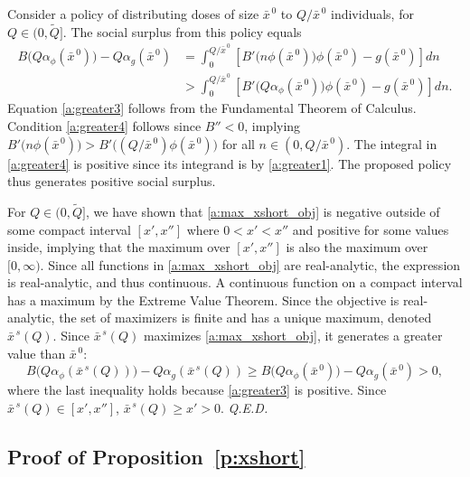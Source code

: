 \documentclass[12pt]{article}
\renewcommand{\qed}{{\it Q.E.D.}}
\newcommand{\efficacy}{\phi}
\newcommand{\general}{g}
\newcommand{\benefit}{B}
\newcommand{\xshortbar}{\bar{x}^{\,s}}
\newcommand{\xnobar}{\bar{x}^{\,0}}
\newcommand{\perunit}[1]{\alpha_{#1}}
\newcommand{\Qtilde}{\tilde{Q}}
\begin{document}
Consider a policy of distributing doses of size $\xnobar$ to $Q /
\xnobar$ individuals, for $Q \in (0, \Qtilde]$. The social surplus
from this policy equals
\begin{align}
\benefit \bigl( Q \perunit{\efficacy}\!(\xnobar) \bigr) - Q \perunit{\general}\!(\xnobar) 
& = \int_0^{Q/\xnobar} \left[ \benefit' \! \bigl( n \efficacy(\xnobar) \bigr) \efficacy(\xnobar) - \general(\xnobar) \right] dn \label{a:greater2} \\
& > \int_0^{Q/\xnobar} \left[ \benefit' \! \bigl( Q \perunit{\efficacy}\!(\xnobar) \bigr) \efficacy(\xnobar) - \general(\xnobar) \right] dn. \label{a:greater3} 
\end{align}
Equation \eqref{a:greater3} follows from the Fundamental Theorem of
Calculus. Condition \eqref{a:greater4} follows since $\benefit'' < 0$,
implying $\benefit' \! \bigl( n \efficacy(\xnobar) \bigr) > \benefit'
\! \bigl( (Q/\xnobar)\efficacy(\xnobar) \bigr)$ for all $n \in (0,
Q/\xnobar)$. The integral in \eqref{a:greater4} is positive since its
integrand is by \eqref{a:greater1}. The proposed policy thus generates
positive social surplus.

For $Q \in (0, \Qtilde]$, we have shown that \eqref{a:max_xshort_obj}
  is negative outside of some compact interval $[x', x'']$ where $0 <
  x' < x''$ and positive for some values inside, implying that the
  maximum over $[x', x'']$ is also the maximum over $[0,
    \infty)$. Since all functions in \eqref{a:max_xshort_obj} are
    real-analytic, the expression is real-analytic, and thus
    continuous. A continuous function on a compact interval has a
    maximum by the Extreme Value Theorem. Since the objective is
    real-analytic, the set of maximizers is finite and has a unique
    maximum, denoted $\xshortbar\!(Q)$. Since $\xshortbar\!(Q)$
    maximizes \eqref{a:max_xshort_obj}, it generates a greater value
    than $\xnobar$:
\begin{equation}
\label{a:greater4}
\benefit \bigl( Q \perunit{\efficacy}\!(\xshortbar\!(Q)) \bigr) - Q
\perunit{\general}\!(\xshortbar\!(Q)) \geq \benefit \bigl( Q
\perunit{\efficacy}\!(\xnobar) \bigr) - Q
\perunit{\general}\!(\xnobar) > 0,
\end{equation}
where the last inequality holds because \eqref{a:greater3} is
positive. Since $\xshortbar\!(Q) \in [x', x'']$, $\xshortbar\!(Q) \geq
x' > 0$. \qed


\subsection*{Proof of Proposition~\ref{p:xshort}}
\end{document}
